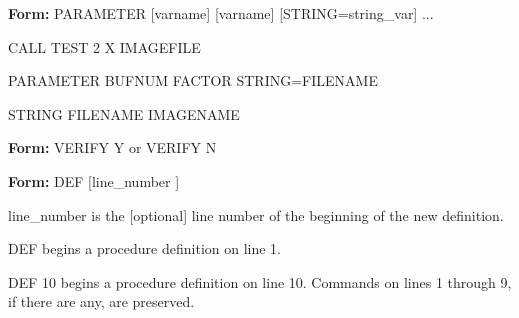 {\newpage\clearpage
{}%
\begin{command}
  \item[\textbf{Form: } PARAMETER {[varname]} {[varname]} {[STRING=string\_var]} ...\hfill]{}
\end{command}%
\lthtmlfigureZ
\lthtmlcheckvsize\clearpage}

{\newpage\clearpage
{}%
\begin{hanging}
  \item{CALL TEST 2 X IMAGEFILE}
\end{hanging}%
\lthtmlfigureZ
\lthtmlcheckvsize\clearpage}

{\newpage\clearpage
{}%
\begin{hanging}
  \item{PARAMETER BUFNUM FACTOR STRING=FILENAME}
\end{hanging}%
\lthtmlfigureZ
\lthtmlcheckvsize\clearpage}

{\newpage\clearpage
{}%
\begin{hanging}
  \item{STRING FILENAME IMAGENAME}
\end{hanging}%
\lthtmlfigureZ
\lthtmlcheckvsize\clearpage}

{\newpage\clearpage
{}%
\begin{command}
  \item[\textbf{Form: } VERIFY Y or VERIFY N\hfill]{}
\end{command}%
\lthtmlfigureZ
\lthtmlcheckvsize\clearpage}

{\newpage\clearpage
{}%
\begin{command} 
  \item[\textbf{Form: } DEF [line\_number]\hfill]{}
  \item[line\_number]{is the [optional] line number of the
beginning of the new definition.}
\end{command}%
\lthtmlfigureZ
\lthtmlcheckvsize\clearpage}

{\newpage\clearpage
{}%
\begin{example}
  \item[DEF\hfill]{begins a procedure definition on line 1.}
  \item[DEF 10\hfill]{begins a procedure definition on line 10.  
       Commands on lines 1 through 9, if there are any, are preserved.}
\end{example}%
\lthtmlfigureZ
\lthtmlcheckvsize\clearpage}

